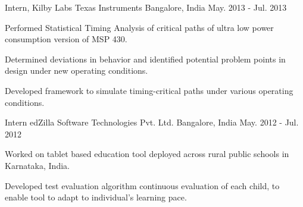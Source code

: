 \begin{cventries}
	\cventry
	{Intern, Kilby Labs}
	{Texas Instruments}
	{Bangalore, India}
	{May. 2013 - Jul. 2013}
	{
		\begin{cvitems}
		\item{Performed Statistical Timing Analysis of critical paths of ultra low power consumption version of MSP 430.}
		\item{Determined deviations in behavior and identified potential problem points in design under new operating conditions.}
		\item{Developed framework to simulate timing-critical paths under various operating conditions.}
		\end{cvitems}
	}

	\cventry
	{Intern}
	{edZilla Software Technologies Pvt. Ltd.}
	{Bangalore, India}
	{May. 2012 - Jul. 2012}
	{
		\begin{cvitems}
		\item{Worked on tablet based education tool deployed across rural public schools in Karnataka, India.}
		\item{Developed test evaluation algorithm continuous evaluation of each child, to enable tool to adapt to individual's learning pace.}
		\end{cvitems}
	}

\end{cventries}
